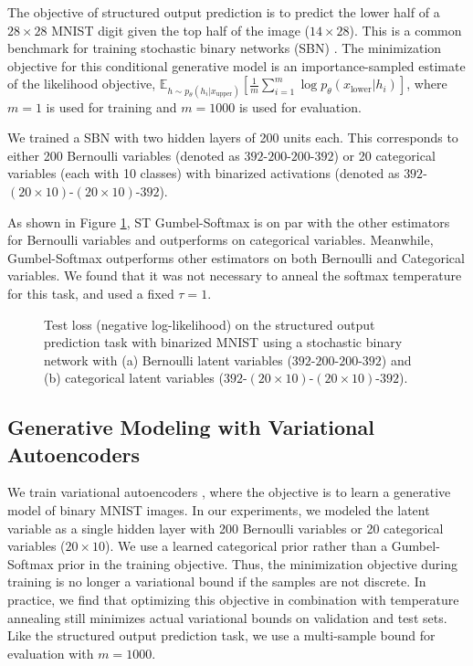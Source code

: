 \documentclass{article} %
\begin{document}
The objective of structured output prediction is to predict the lower half of a $28 \times 28$ MNIST digit given the top half of the image ($14 \times 28$). This is a common  benchmark for training stochastic binary networks (SBN) \citep{2014arXiv1406.2989R,gu2016,VIMCO}. The minimization objective for this conditional generative model is an importance-sampled estimate of the likelihood objective, $\mathbb{E}_{h \sim p_\theta(h_i|x_\text{upper})}\left[ \frac{1}{m} \sum_{i=1}^m \log p_\theta(x_\text{lower}|h_i) \right]$, where $m=1$ is used for training and $m=1000$ is used for evaluation.

We trained a SBN with two hidden layers of 200 units each. This corresponds to either 200 Bernoulli variables (denoted as $392$-$200$-$200$-$392$) or 20 categorical variables (each with 10 classes) with binarized activations (denoted as $392$-$(20 \times 10)$-$(20 \times 10)$-$392$).

As shown in Figure \ref{fig:sbn_curves}, ST Gumbel-Softmax is on par with the other estimators for Bernoulli variables and outperforms on categorical variables. Meanwhile, Gumbel-Softmax outperforms other estimators on both Bernoulli and Categorical variables. We found that it was not necessary to anneal the softmax temperature for this task, and used a fixed $\tau=1$.

\begin{figure}[h]
  \centering
  \caption{Test loss (negative log-likelihood) on the structured output prediction task with binarized MNIST using a stochastic binary network with (a) Bernoulli latent variables ($392$-$200$-$200$-$392$) and (b) categorical latent variables ($392$-$(20 \times 10)$-$(20 \times 10)$-$392$). }
  \label{fig:sbn_curves}
\end{figure}

\subsection{Generative Modeling with Variational Autoencoders}

We train variational autoencoders \citep{kingma_vae}, where the objective is to learn a generative model of binary MNIST images. In our experiments, we modeled the latent variable as a single hidden layer with 200 Bernoulli variables or 20 categorical variables ($20 \times 10$). We use a learned categorical prior rather than a Gumbel-Softmax prior in the training objective. Thus, the minimization objective during training is no longer a variational bound if the samples are not discrete. In practice, we find that optimizing this objective in combination with temperature annealing still minimizes actual variational bounds on validation and test sets. Like the structured output prediction task, we use a multi-sample bound for evaluation with $m=1000$.
\end{document}
